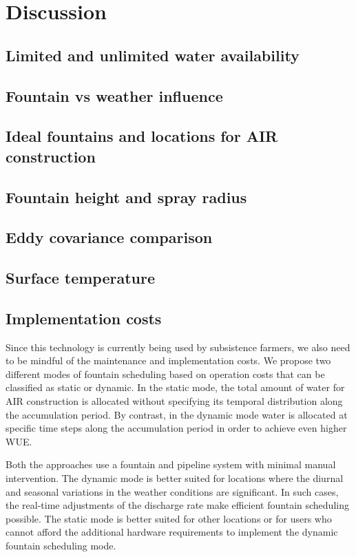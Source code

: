 \documentclass[tc, manuscript]{copernicus}
\begin{document}
\section{Discussion}
\subsection{Limited and unlimited water availability}

\subsection{Fountain vs weather influence}

\subsection{Ideal fountains and locations for AIR construction}

\subsection{Fountain height and spray radius}

\subsection{Eddy covariance comparison}

\subsection{Surface temperature}

\subsection{Implementation costs}

Since this technology is currently being used by subsistence farmers, we also need to be mindful of the
maintenance and implementation costs. We propose two different modes of fountain scheduling based on operation
costs that can be classified as static or dynamic. In the static mode, the total amount of water
for AIR construction is allocated without specifying its temporal distribution along the accumulation period. By
contrast, in the dynamic mode water is allocated at specific time steps along the accumulation period in
order to achieve even higher WUE.

Both the approaches use a fountain and pipeline system with minimal manual intervention. The dynamic mode is
better suited for locations where the diurnal and seasonal variations in the weather conditions are significant.
In such cases, the real-time adjustments of the discharge rate make efficient fountain scheduling
possible. The static mode is better suited for other locations or for users who cannot afford the additional
hardware requirements to implement the dynamic fountain scheduling mode.
\end{document}
